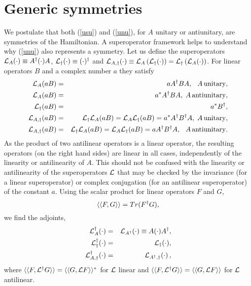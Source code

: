 \section{Generic symmetries}
%
%
We postulate that both (\ref{usu}) and (\ref{unu}), for $A$ unitary or antiunitary,  are symmetries of the Hamiltonian.
A superoperator framework helps to understand why (\ref{unu}) also represents a symmetry.
Let us define the superoperators ${\cal L}_A(\cdot) \equiv A^\dagger(\cdot) A$, ${\cal L}_\dagger (\cdot)\equiv (\cdot)^\dagger$ and ${\cal L}_{A,\dagger}(\cdot)\equiv {\cal L}_A\left({\cal L}_\dagger (\cdot)\right) = {\cal L}_\dagger\left({\cal L}_A (\cdot)\right) $. For  linear operators $B$ and a complex number $a$ they satisfy
%
%
\begin{eqnarray}
{\cal L}_A (a B)&=& a A^\dagger  B A,\;\;\,  A\, {\rm unitary},
\\
{\cal L}_A (a B)&=& a^* A^\dagger  B A,\;  A\, {\rm antiunitary},
\\
{\cal L}_{\dagger} (a B)&=& a^*B^\dagger,
\\
{\cal L}_{A,\dagger} (a B)&=& {\cal L}_{\dagger} {\cal L}_A  (aB)=    {\cal L}_A  {\cal L}_{\dagger} (aB) = a^* A^\dagger B^\dagger A,\;
A\, {\rm{unitary}},
\\
{\cal L}_{A,\dagger} (a B)&=& {\cal L}_{\dagger} {\cal L}_A  (aB)=    {\cal L}_A  {\cal L}_{\dagger} (aB) = a A^\dagger B^\dagger A,\;\;\,
A\, {\rm{antiunitary}}.
\end{eqnarray}
%
As the product of two antilinear operators is a linear operator,
the resulting operators (on the right hand sides) are linear in all cases,
independently of the linearity or antilinearity of $A$. This should not be confused with the linearity or antilinearity
of the superoperators ${\cal L}$ that may be checked by the invariance (for a linear superoperator)
or complex conjugation (for an antilinear
superoperator) of the constant $a$.
Using the scalar product for linear operators $F$ and $G$,
%
\begin{equation}
\langle\langle F,G\rangle\rangle=Tr (F^\dagger G),
\end{equation}
%
we find the adjoints,
%
%
\begin{eqnarray}
{\cal L}_A^\dagger(\cdot)&=& {\cal L}_{A^\dagger}(\cdot)\equiv A(\cdot)A^\dagger,
\\
{\cal L}_{\dagger}^\dagger(\cdot) &=&{\cal L}_{\dagger}(\cdot),
\\
{\cal L}_{A,\dagger}^\dagger (\cdot) &=& {\cal L}_{A^\dagger, \dagger}(\cdot)\,,
\end{eqnarray}
%
where $\langle\langle F,{\cal L}^\dagger G\rangle\rangle=\langle\langle G,{\cal L} F\rangle\rangle^*$ for ${\cal L}$ linear
and $\langle\langle F,{\cal L}^\dagger G\rangle\rangle=\langle\langle G,{\cal L} F\rangle\rangle$ for ${\cal L}$ antilinear.

